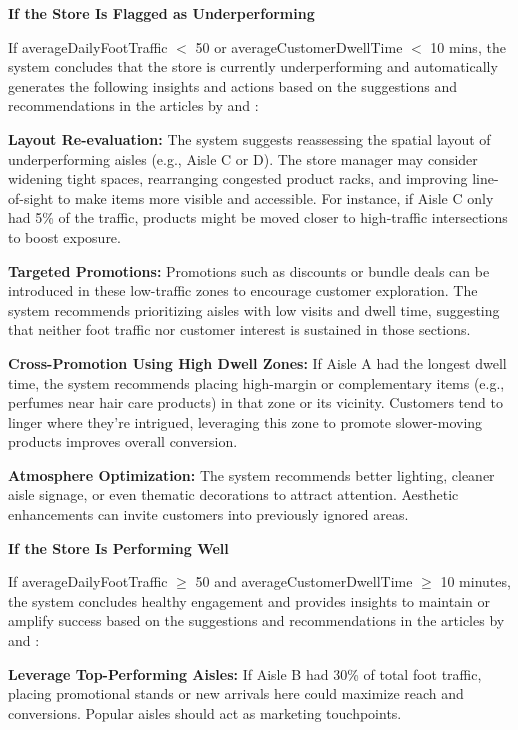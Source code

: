 {\noindent\textbf{If the Store Is Flagged as Underperforming}

If averageDailyFootTraffic $<$ 50 or averageCustomerDwellTime $<$ 10 mins, the system concludes that the store is currently underperforming and automatically generates the following insights and actions based on the suggestions and recommendations in the articles by \cite{BPlanAI2025} and \cite{CountTrack2025}:

\textbf{Layout Re-evaluation:} The system suggests reassessing the spatial layout of underperforming aisles (e.g., Aisle C or D). The store manager may consider widening tight spaces, rearranging congested product racks, and improving line-of-sight to make items more visible and accessible. For instance, if Aisle C only had 5\% of the traffic, products might be moved closer to high-traffic intersections to boost exposure.

\textbf{Targeted Promotions:} Promotions such as discounts or bundle deals can be introduced in these low-traffic zones to encourage customer exploration. The system recommends prioritizing aisles with low visits and dwell time, suggesting that neither foot traffic nor customer interest is sustained in those sections.

\textbf{Cross-Promotion Using High Dwell Zones:} If Aisle A had the longest dwell time, the system recommends placing high-margin or complementary items (e.g., perfumes near hair care products) in that zone or its vicinity. Customers tend to linger where they’re intrigued, leveraging this zone to promote slower-moving products improves overall conversion.

\textbf{Atmosphere Optimization:} The system recommends better lighting, cleaner aisle signage, or even thematic decorations to attract attention. Aesthetic enhancements can invite customers into previously ignored areas.

\noindent\textbf{If the Store Is Performing Well}

If averageDailyFootTraffic $\geq$ 50 and averageCustomerDwellTime $\geq$ 10 minutes, the system concludes healthy engagement and provides insights to maintain or amplify success based on the suggestions and recommendations in the articles by \cite{BPlanAI2025} and \cite{CountTrack2025}:

\textbf{Leverage Top-Performing Aisles:} If Aisle B had 30\% of total foot traffic, placing promotional stands or new arrivals here could maximize reach and conversions. Popular aisles should act as marketing touchpoints.

}
